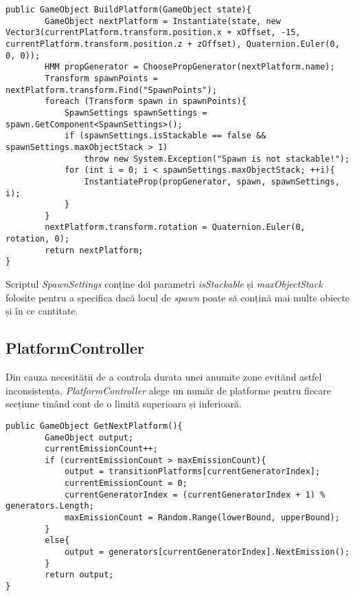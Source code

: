 \begin{lstlisting}[caption=Funcțiile din PlatformBuilder,
  label=a_label]
public GameObject BuildPlatform(GameObject state){
        GameObject nextPlatform = Instantiate(state, new Vector3(currentPlatform.transform.position.x + xOffset, -15, currentPlatform.transform.position.z + zOffset), Quaternion.Euler(0, 0, 0));
        HMM propGenerator = ChoosePropGenerator(nextPlatform.name);
        Transform spawnPoints = nextPlatform.transform.Find("SpawnPoints");
        foreach (Transform spawn in spawnPoints){
            SpawnSettings spawnSettings = spawn.GetComponent<SpawnSettings>();
            if (spawnSettings.isStackable == false && spawnSettings.maxObjectStack > 1)
                throw new System.Exception("Spawn is not stackable!");
            for (int i = 0; i < spawnSettings.maxObjectStack; ++i){
                InstantiateProp(propGenerator, spawn, spawnSettings, i);
            }
        }
        nextPlatform.transform.rotation = Quaternion.Euler(0, rotation, 0);
        return nextPlatform;
}
\end{lstlisting}

Scriptul \textit{SpawnSettings} conține doi parametri \textit{isStackable} și \textit{maxObjectStack} folosite pentru a specifica dacă locul de \textit{spawn} poate să conțină mai multe obiecte și în ce cantitate.\par

\subsection{PlatformController}

Din cauza necesității de a controla durata unei anumite zone evitănd astfel inconsistența, \textit{PlatformController} alege un număr de platforme pentru fiecare secțiune tinând cont de o limită superioara și inferioară.\par

\begin{lstlisting}[caption=Funcțiile din PlatformController,
  label=a_label,
  mathescape=false]
public GameObject GetNextPlatform(){
        GameObject output;
        currentEmissionCount++;
        if (currentEmissionCount > maxEmissionCount){
            output = transitionPlatforms[currentGeneratorIndex];
            currentEmissionCount = 0;
            currentGeneratorIndex = (currentGeneratorIndex + 1) % generators.Length;
            maxEmissionCount = Random.Range(lowerBound, upperBound);
        }
        else{
            output = generators[currentGeneratorIndex].NextEmission();
        }
        return output;
}
\end{lstlisting}
